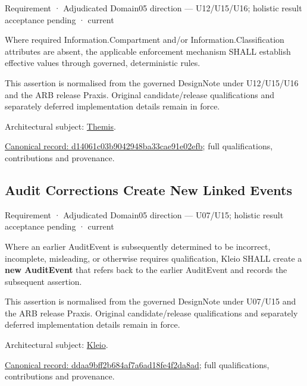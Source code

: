 \label{element:d14061c03b9042948ba33cae91e02efb}
{\small Requirement · Adjudicated Domain05 direction — U12/U15/U16; holistic result acceptance pending · current}\par

Where required Information.Compartment and/or Information.Classification attributes are absent, the applicable enforcement mechanism SHALL establish effective values through governed, deterministic rules.



This assertion is normalised from the governed DesignNote under U12/U15/U16 and the ARB release Praxis. Original candidate/release qualifications and separately deferred implementation details remain in force.



Architectural subject: \hyperref[element:899d34ec491948b68aad09e507dea6d1]{Themis}.


{\footnotesize \href{../../../../continuum/motivation/requirement/d14061c03b9042948ba33cae91e02efb.md}{Canonical record: d14061c03b9042948ba33cae91e02efb}; full qualifications, contributions and provenance.}\par
\subsection{Audit Corrections Create New Linked Events}

\label{element:ddaa9bff2b684af7a6ad18fe4f2da8ad}
{\small Requirement · Adjudicated Domain05 direction — U07/U15; holistic result acceptance pending · current}\par

Where an earlier AuditEvent is subsequently determined to be incorrect, incomplete, misleading, or otherwise requires qualification, Kleio SHALL create a \textbf{new AuditEvent} that refers back to the earlier AuditEvent and records the subsequent assertion.



This assertion is normalised from the governed DesignNote under U07/U15 and the ARB release Praxis. Original candidate/release qualifications and separately deferred implementation details remain in force.



Architectural subject: \hyperref[element:fefda110e2274884ad58906733606efd]{Kleio}.


{\footnotesize \href{../../../../continuum/motivation/requirement/ddaa9bff2b684af7a6ad18fe4f2da8ad.md}{Canonical record: ddaa9bff2b684af7a6ad18fe4f2da8ad}; full qualifications, contributions and provenance.}\par
